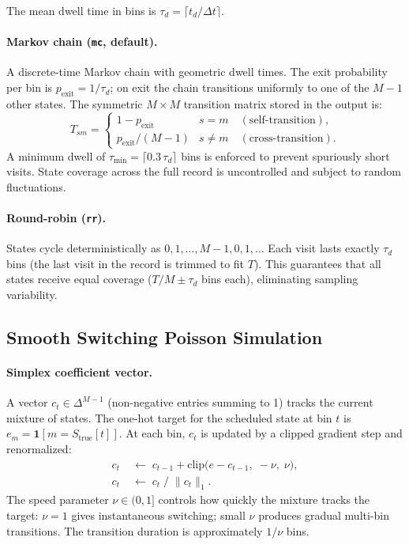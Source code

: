 \documentclass[11pt]{article}
\begin{document}
The mean dwell time in bins is
$\tau_d = \lceil t_d / \Delta t \rceil$.

\paragraph{Markov chain (\texttt{mc}, default).}
A discrete-time Markov chain with geometric dwell times.
The exit probability per bin is $p_{\mathrm{exit}} = 1/\tau_d$;
on exit the chain transitions uniformly to one of the $M-1$ other states.
The symmetric $M \times M$ transition matrix stored in the output is:
\begin{equation}
  T_{sm} =
  \begin{cases}
    1 - p_{\mathrm{exit}} & s = m \quad (\text{self-transition}), \\
    p_{\mathrm{exit}}/(M-1) & s \neq m \quad (\text{cross-transition}).
  \end{cases}
  \label{eq:trans}
\end{equation}
A minimum dwell of
$\tau_{\min} = \lceil 0.3\,\tau_d \rceil$ bins is enforced
to prevent spuriously short visits.
State coverage across the full record is uncontrolled and subject
to random fluctuations.

\paragraph{Round-robin (\texttt{rr}).}
States cycle deterministically as $0, 1, \dots, M-1, 0, 1, \dots$
Each visit lasts exactly $\tau_d$ bins (the last visit in the
record is trimmed to fit $T$).
This guarantees that all states receive equal coverage
($T/M \pm \tau_d$ bins each), eliminating sampling variability.

\subsection{Smooth Switching Poisson Simulation}
\label{sec:switching}

\paragraph{Simplex coefficient vector.}
A vector $c_t \in \Delta^{M-1}$
(non-negative entries summing to 1) tracks the current mixture of
states.
The one-hot target for the scheduled state at bin $t$ is
$e_m = \mathbf{1}[m = S_{\text{true}}[t]]$.
At each bin, $c_t$ is updated by a clipped gradient step and
renormalized:
\begin{align}
  c_t &\;\leftarrow\; c_{t-1}
        + \mathrm{clip}\!\bigl(e - c_{t-1},\; -\nu,\; \nu\bigr), \\
  c_t &\;\leftarrow\; c_t \;/\; \|c_t\|_1.
  \label{eq:smooth_update}
\end{align}
The speed parameter $\nu \in (0,1]$ controls how quickly the mixture
tracks the target: $\nu = 1$ gives instantaneous switching;
small $\nu$ produces gradual multi-bin transitions.
The transition duration is approximately $1/\nu$ bins.
\end{document}

